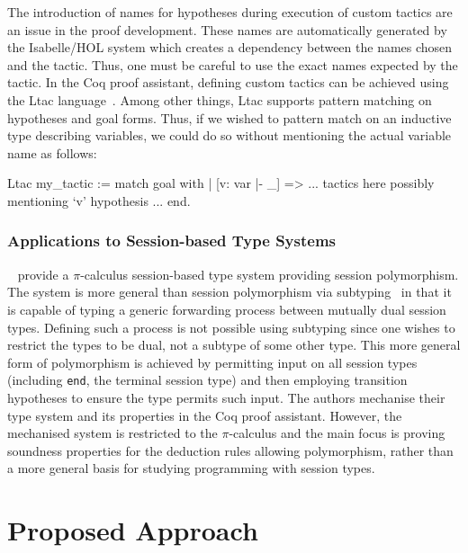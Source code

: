 \documentclass{mprop}
\begin{document}
The introduction of names for hypotheses during execution of custom tactics
are an issue in the proof development. These names are automatically generated
by the Isabelle/HOL system which creates a dependency between the names chosen
and the tactic. Thus, one must be careful to use the exact names expected by
the tactic. In the Coq proof assistant, defining custom tactics can be
achieved using the Ltac language~\cite{Delahaye:2000:TLS}. Among other things,
Ltac supports pattern matching on hypotheses and goal forms. Thus, if we
wished to pattern match on an inductive type describing variables, we could do
so without mentioning the actual variable name as follows:

\begin{coq}
Ltac my_tactic :=
  match goal with
  | [v: var |- _] => ... tactics here possibly mentioning `v' hypothesis ...
  end.
\end{coq}

\subsubsection{Applications to Session-based Type Systems}\label{sec:asts}

\citeauthor{Goto:2014}~\cite{Goto:2014} provide a $\pi$-calculus session-based
type system providing session polymorphism. The system is more general than
session polymorphism via subtyping~\cite{Gay:2005:SST} in that it is capable
of typing a generic forwarding process between mutually dual session
types. Defining such a process is not possible using subtyping since one
wishes to restrict the types to be dual, not a subtype of some other
type. This more general form of polymorphism is achieved by permitting input
on all session types (including \lstinline{end}, the terminal session type)
and then employing transition hypotheses to ensure the type permits such
input. The authors mechanise their type system and its properties in the Coq
proof assistant. However, the mechanised system is restricted to the
$\pi$-calculus and the main focus is proving soundness properties for the
deduction rules allowing polymorphism, rather than a more general basis for
studying programming with session types.

\section{Proposed Approach}\label{sec:approach}
\end{document}
